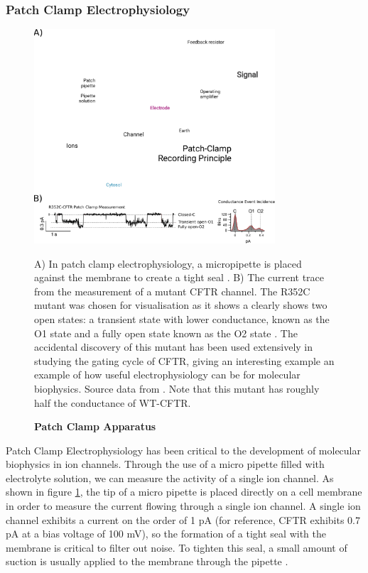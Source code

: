 \subsubsection{Patch Clamp Electrophysiology}
\begin{figure}
	\begin{center}
	\includegraphics[width=0.8\textwidth]{figures/R352C_ephys_measurement_figure.pdf}
	\end{center}
	\captionsetup{singlelinecheck = false, justification=raggedright}
	\caption[Patch Clamp Apparatus] {\textbf{Patch Clamp Apparatus}}{A) In patch clamp electrophysiology, a micropipette is placed against the membrane to create a tight seal \cite{patch_clamp_recording_principal_figure}. B) The current trace from the measurement of a mutant CFTR channel. The R352C mutant was chosen for visualisation as it shows a clearly shows two open states: a transient state with lower conductance, known as the O1 state and a fully open state known as the O2 state \cite{jih2012}. The accidental discovery of this mutant has been used extensively in studying the gating cycle of CFTR, giving an interesting example an example of how useful electrophysiology can be for molecular biophysics. Source data from \cite{jih2012}. Note that this mutant has roughly half the conductance of WT-CFTR.} 
	\label{patch_clamp}
\end{figure}

Patch Clamp Electrophysiology has been critical to the development of molecular biophysics in ion channels. Through the use of a micro pipette filled with electrolyte solution, we can measure the activity of a single ion channel. As shown in figure \ref{patch_clamp}, the tip of a micro pipette is placed directly on a cell membrane in order to measure the current flowing through a single ion channel. A single ion channel exhibits a current on the order of 1 pA (for reference, CFTR exhibits 0.7 pA at a bias voltage of 100 mV), so the formation of a tight seal with the membrane is critical to filter out noise. To tighten this seal, a small amount of suction is usually applied to the membrane through the pipette \cite{aidley1996}.

